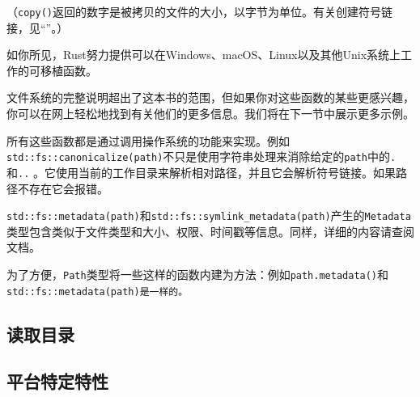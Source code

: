 （\texttt{copy()}返回的数字是被拷贝的文件的大小，以字节为单位。有关创建符号链接，见“”。）

如你所见，Rust努力提供可以在Windows、macOS、Linux以及其他Unix系统上工作的可移植函数。

文件系统的完整说明超出了这本书的范围，但如果你对这些函数的某些更感兴趣，你可以在网上轻松地找到有关他们的更多信息。我们将在下一节中展示更多示例。

所有这些函数都是通过调用操作系统的功能来实现。例如\texttt{std::fs::canonicalize(path)}不只是使用字符串处理来消除给定的\texttt{path}中的\texttt{.}和\texttt{..} 。它使用当前的工作目录来解析相对路径，并且它会解析符号链接。如果路径不存在它会报错。

\texttt{std::fs::metadata(path)}和\texttt{std::fs::symlink\_metadata(path)}产生的\texttt{Metadata}类型包含类似于文件类型和大小、权限、时间戳等信息。同样，详细的内容请查阅文档。

为了方便，\texttt{Path}类型将一些这样的函数内建为方法：例如\texttt{path.metadata()}和\texttt{std::fs::metadata(path)是一样的。}

\subsection{读取目录}

\subsection{平台特定特性}\label{PlatSpec}
